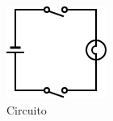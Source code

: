 \begin{frame}
\begin{columns}
		\begin{figure}[!htbp]
			\centering 
			\includegraphics[width=0.85\linewidth]{images/2_le_architetture/logic_gate_circuit_and.png}
			\caption{Circuito}
		\end{figure}
		
	\end{columns}
	
\end{frame}


